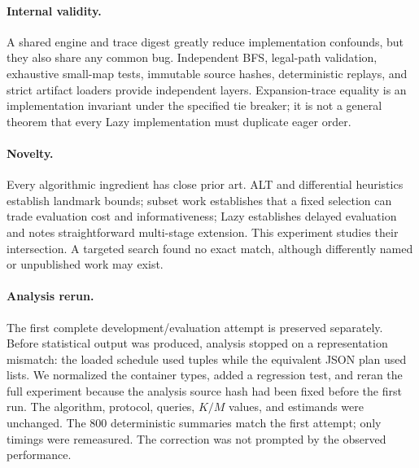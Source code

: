 \paragraph{Internal validity.}
A shared engine and trace digest greatly reduce implementation confounds, but
they also share any common bug.  Independent BFS, legal-path validation,
exhaustive small-map tests, immutable source hashes, deterministic replays,
and strict artifact loaders provide independent layers.  Expansion-trace
equality is an implementation invariant under the specified tie breaker; it is
not a general theorem that every Lazy \Astar{} implementation must duplicate
eager order.

\paragraph{Novelty.}
Every algorithmic ingredient has close prior art.  ALT and differential
heuristics establish landmark bounds; subset work establishes that a fixed
selection can trade evaluation cost and informativeness; Lazy \Astar{}
establishes delayed evaluation and notes straightforward multi-stage
extension.  This experiment studies their intersection.  A targeted search
found no exact match, although differently named or unpublished work may
exist.

\paragraph{Analysis rerun.}
The first complete development/evaluation attempt is preserved separately.
Before statistical output was produced, analysis stopped on a representation
mismatch: the loaded schedule used tuples while the equivalent JSON plan used
lists.  We normalized the container types, added a regression test, and reran
the full experiment because the analysis source hash had been fixed before the
first run.  The algorithm, protocol, queries, $K/M$ values, and estimands were
unchanged.  The 800 deterministic summaries match the first attempt; only
timings were remeasured.  The correction was not prompted by the observed
performance.
